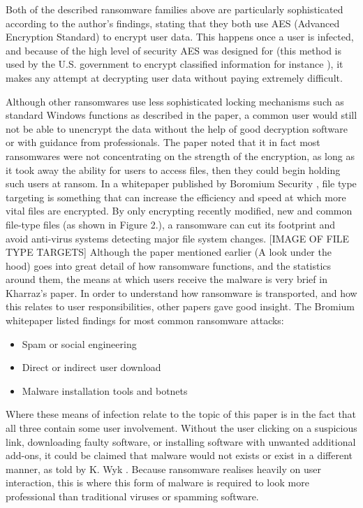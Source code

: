 \documentclass[journal,comsoc]{IEEEtran}
\begin{document}
Both of the described ransomware families above are particularly sophisticated according to the author’s findings, stating that they both use AES (Advanced Encryption Standard) to encrypt user data. This happens once a user is infected, and because of the high level of security AES was designed for (this method is used by the U.S. government to encrypt classified information for instance \cite{aes}), it makes any attempt at decrypting user data without paying extremely difficult. \par
Although other ransomwares use less sophisticated locking mechanisms such as standard Windows functions as described in the paper, a common user would still not be able to unencrypt the data without the help of good decryption software or with guidance from professionals. The paper noted that it in fact most ransomwares were not concentrating on the strength of the encryption, as long as it took away the ability for users to access files, then they could begin holding such users at ransom. In a whitepaper published by Boromium Security \cite{bromium}, file type targeting is something that can increase the efficiency and speed at which more vital files are encrypted. By only encrypting recently modified, new and common file-type files (as shown in Figure 2.), a ransomware can cut its footprint and avoid anti-virus systems detecting major file system changes.
[IMAGE OF FILE TYPE TARGETS]
Although the paper mentioned earlier (A look under the hood) goes into great detail of how ransomware functions, and the statistics around them, the means at which users receive the malware is very brief in Kharraz’s paper. In order to understand how ransomware is transported, and how this relates to user responsibilities, other papers gave good insight. The Bromium whitepaper \cite{bromium}listed findings for most common ransomware attacks:
\begin{itemize}
\item Spam or social engineering
\item Direct or indirect user download
\item Malware installation tools and botnets
\end{itemize}
Where these means of infection relate to the topic of this paper is in the fact that all three contain some user involvement. Without the user clicking on a suspicious link, downloading faulty software, or installing software with unwanted additional add-ons, it could be claimed that malware would not exists or exist in a different manner, as told by K. Wyk \cite{artical}. Because ransomware realises heavily on user interaction, this is where this form of malware is required to look more professional than traditional viruses or spamming software. \par
\end{document}
